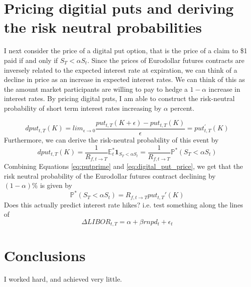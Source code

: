 \documentclass[11pt]{article}
\begin{document}
\section{Pricing digitial puts and deriving the risk neutral probabilities}
I next consider the price of a digital put option, that is the price of a claim to \$1 paid if and only if $S_{T} < \alpha S_{t}$. Since the prices of Eurodollar futures contracts are inversely related to the expected interest rate at expiration, we can think of a decline in price as an increase in expected interest rates. We can think of this as the amount market participants are willing to pay to hedge a $1-\alpha$ increase in interest rates. By pricing digital puts, I am able to construct the risk-neutral probability of short term interest rates increasing by $\alpha$ percent.  


 \begin{equation} 
 	dput_{t, T}(K) = lim_{\epsilon \rightarrow 0} \frac{put_{t, T}(K+\epsilon)-put_{t, T}(K)}{\epsilon} = put_{t, T}^{'}(K)
 	\label{eq:putprime}
 \end{equation}
 Furthermore, we can derive the risk-neutral probability of this event by 
 \begin{equation}
 	dput_{t, T}(K) =  \dfrac{1}{R_{f, t\to T}} \mathbb{E}_{t}^{*}\textbf{1}_{S_{T} < \alpha S_{t}} = \dfrac{1}{R_{f, t\to T}}\mathbb{P}^{*}(S_{T}<\alpha S_{t})
 	\label{eq:digital_put_price}
 \end{equation}
 Combining Equations \ref{eq:putprime} and \ref{eq:digital_put_price}, we get that the risk neutral probability of the Eurodollar futures contract declining by $(1-\alpha) \%$ is given by 
 \begin{equation*}
 	\mathbb{P}^{*}(S_{T}<\alpha S_{t}) = R_{f, t\to T}put_{t, T}'(K)
 \end{equation*}
 {\color{red} Does this actually predict interest rate hikes? i.e. test something along the lines of 
 \begin{equation*}
 	\Delta LIBOR_{t, T} = \alpha + \beta rnpd_{t} + \epsilon_{t}
\end{equation*}}
\section{Conclusions}\label{conclusions}
I worked hard, and achieved very little.
\end{document}
